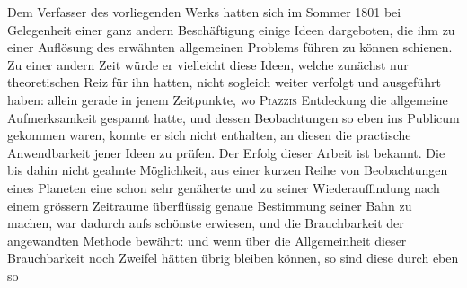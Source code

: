 Dem Verfasser des vorliegenden Werks hatten sich im Sommer 1801 bei Gelegenheit einer ganz andern Beschäftigung einige Ideen dargeboten, die ihm zu einer Auflösung des erwähnten allgemeinen Problems führen zu können schienen. Zu einer andern Zeit würde er vielleicht diese Ideen, welche zunächst nur theoretischen Reiz für ihn hatten, nicht sogleich weiter verfolgt und ausgeführt haben: allein gerade in jenem Zeitpunkte, wo \textsc{Piazzis} Entdeckung die allgemeine Aufmerksamkeit gespannt hatte, und dessen Beobachtungen so eben ins Publicum gekommen waren, konnte er sich nicht enthalten, an diesen die practische Anwendbarkeit jener Ideen zu prüfen. Der Erfolg dieser Arbeit ist bekannt. Die bis dahin nicht geahnte Möglichkeit, aus einer kurzen Reihe von Beobachtungen eines Planeten eine schon sehr genäherte und zu seiner Wiederauffindung nach einem grössern Zeitraume überflüssig genaue Bestimmung seiner Bahn zu machen, war dadurch aufs schönste erwiesen, und die Brauchbarkeit der angewandten Methode bewährt: und wenn über die Allgemeinheit dieser Brauchbarkeit noch Zweifel hätten übrig bleiben können, so sind diese durch eben so
\par\clearpage
\endgroup
